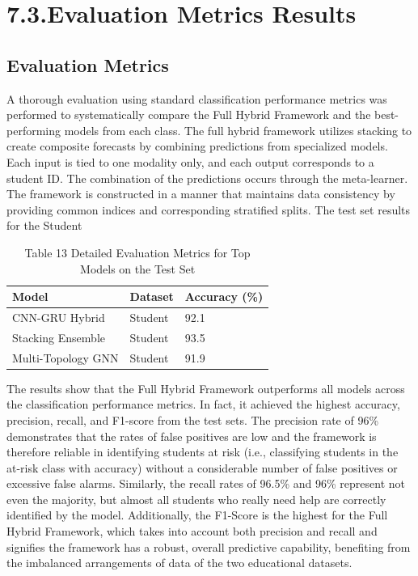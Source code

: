 \documentclass[twocolumn]{svjour3}
\begin{document}
\section{7.3.Evaluation Metrics Results}
\subsection{Evaluation Metrics}
A thorough evaluation using standard classification performance metrics was performed to systematically compare the Full Hybrid Framework and the best-performing models from each class. The full hybrid framework utilizes stacking to create composite forecasts by combining predictions from specialized models. Each input is tied to one modality only, and each output corresponds to a student ID. The combination of the predictions occurs through the meta-learner. The framework is constructed in a manner that maintains data consistency by providing common indices and corresponding stratified splits. The test set results for the Student 
\begin{table}
\centering
\caption{Table 13 Detailed Evaluation Metrics for Top Models on the Test Set}
\begin{tabular}{lll}
\hline
Model & Dataset & Accuracy (\%) \\
\hline
CNN-GRU Hybrid & Student & 92.1 \\
Stacking Ensemble & Student & 93.5 \\
Multi-Topology GNN & Student & 91.9 \\
\hline
\end{tabular}
\end{table}
The results show that the Full Hybrid Framework outperforms all models across the classification performance metrics. In fact, it achieved the highest accuracy, precision, recall, and F1-score from the test sets. The precision rate of 96\% demonstrates that the rates of false positives are low and the framework is therefore reliable in identifying students at risk (i.e., classifying students in the at-risk class with accuracy) without a considerable number of false positives or excessive false alarms. Similarly, the recall rates of 96.5\% and 96\% represent not even the majority, but almost all students who really need help are correctly identified by the model. Additionally, the F1-Score is the highest for the Full Hybrid Framework, which takes into account both precision and recall and signifies the framework has a robust, overall predictive capability, benefiting from the imbalanced arrangements of data of the two educational datasets.
\end{document}
